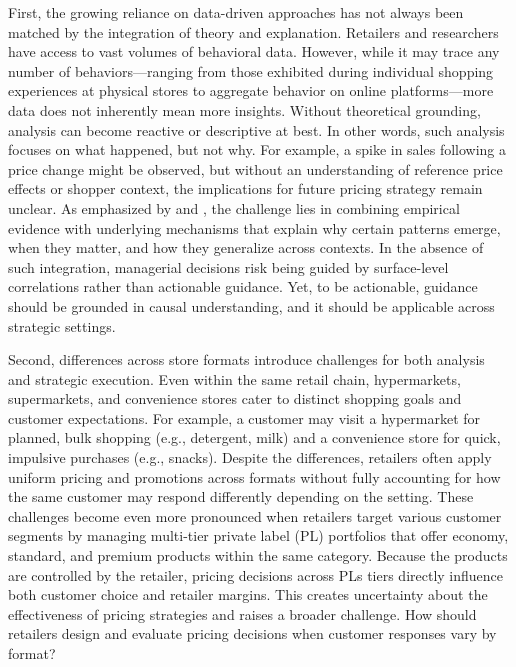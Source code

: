 First, the growing reliance on data-driven approaches has not always been matched by the integration of theory and explanation. Retailers and researchers have access to vast volumes of behavioral data. However, while it may trace any number of behaviors—ranging from those exhibited during individual shopping experiences at physical stores to aggregate behavior on online platforms—more data does not inherently mean more insights. Without theoretical grounding, analysis can become reactive or descriptive at best. In other words, such analysis focuses on what happened, but not why. For example, a spike in sales following a price change might be observed, but without an understanding of reference price effects or shopper context, the implications for future pricing strategy remain unclear. As emphasized by \textcite{Bradlow2017-qf} and \textcite{Dekimpe2020-bh}, the challenge lies in combining empirical evidence with underlying mechanisms that explain why certain patterns emerge, when they matter, and how they generalize across contexts. In the absence of such integration, managerial decisions risk being guided by surface-level correlations rather than actionable guidance. Yet, to be actionable, guidance should be grounded in causal understanding, and it should be applicable across strategic settings.

Second, differences across store formats introduce challenges for both analysis and strategic execution. Even within the same retail chain, hypermarkets, supermarkets, and convenience stores cater to distinct shopping goals and customer expectations. For example, a customer may visit a hypermarket for planned, bulk shopping (e.g., detergent, milk) and a convenience store for quick, impulsive purchases (e.g., snacks). Despite the differences, retailers often apply uniform pricing and promotions across formats without fully accounting for how the same customer may respond differently depending on the setting. These challenges become even more pronounced when retailers target various customer segments by managing multi-tier private label (PL) portfolios that offer economy, standard, and premium products within the same category. Because the products are controlled by the retailer, pricing decisions across PLs tiers directly influence both customer choice and retailer margins. This creates uncertainty about the effectiveness of pricing strategies and raises a broader challenge. How should retailers design and evaluate pricing decisions when customer responses vary by format?

